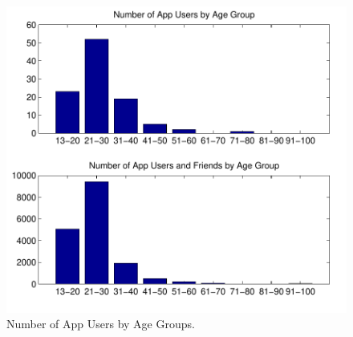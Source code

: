 \begin{figure}[t!]
\centering
\includegraphics[scale=0.55]{data/age_groups_all.pdf}
\vspace{-10pt}
\caption{Number of App Users by Age Groups.}
\label{fig:agegroups}
\end{figure}

